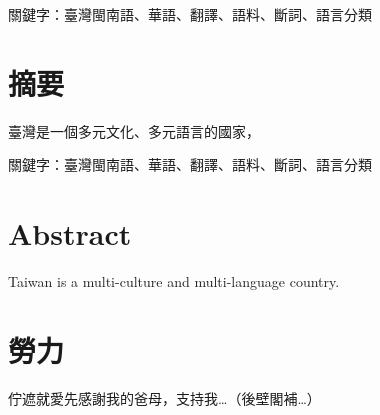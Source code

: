 \documentclass[final,oneside,onecolumn,12pt,a4paper]{book}%
\begin{document}
關鍵字：臺灣閩南語、華語、翻譯、語料、斷詞、語言分類
\newpage

\chapter{摘要}
臺灣是一個多元文化、多元語言的國家，

關鍵字：臺灣閩南語、華語、翻譯、語料、斷詞、語言分類
\newpage

\chapter{Abstract}
Taiwan is a multi-culture and multi-language country.

\newpage

\chapter{勞力}
佇遮就愛先感謝我的爸母，支持我…（後壁閣補…）

\newpage

\tableofcontents
\listoffigures
\listoftables

\mainmatter











\begin{appendices}



\end{appendices}
\end{document}
